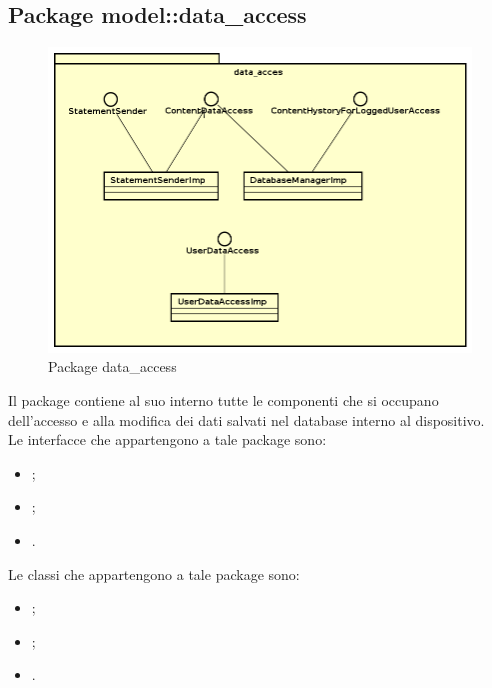 \documentclass[../Tesi.tex]{subfiles}
\begin{document}
	\subsection{Package model::data\_access}
		\begin{figure}[H]
			\centering
			\includegraphics[scale=0.5]{images/package_diagrams/data_access}
				\caption{Package data\_access}
		\end{figure}
		Il package  contiene al suo interno tutte le componenti che si occupano dell'accesso e alla modifica dei dati salvati nel database interno al dispositivo. \\
		Le interfacce che appartengono a tale package sono:
		\begin{itemize}
			\item {};
			\item {};
			\item {}.
		\end{itemize}
		Le classi che appartengono a tale package sono:
		\begin{itemize}
			\item {};
			\item {};
			\item {}.
		\end{itemize}
\end{document}
